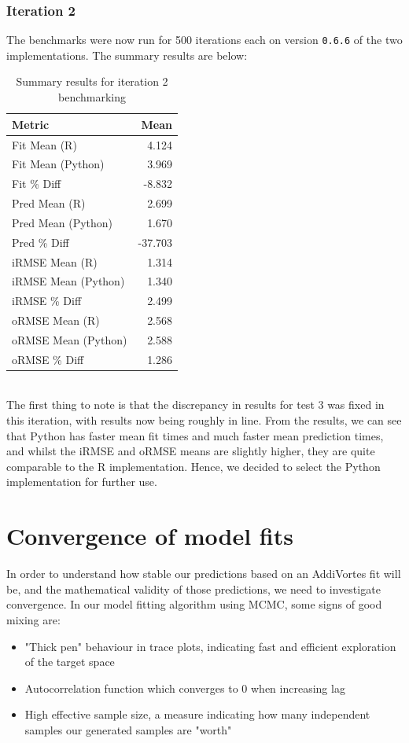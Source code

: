 \documentclass[11pt,twoside,a4paper]{article}
\begin{document}
\subsubsection{Iteration 2}
The benchmarks were now run for 500 iterations each on version \texttt{0.6.6} of the two implementations. The summary results are below:
\begin{table}[h]
\begin{center}
\begin{tabular}{|l|r|}
\hline
Metric & Mean\\
\hline\hline
Fit Mean (R) & 4.124\\
\hline
Fit Mean (Python) & 3.969\\
\hline
Fit \% Diff & -8.832\\
\hline\hline
Pred Mean (R) & 2.699\\
\hline
Pred Mean (Python) & 1.670\\
\hline
Pred \% Diff & -37.703\\
\hline\hline
iRMSE Mean (R) & 1.314\\
\hline
iRMSE Mean (Python) & 1.340\\
\hline
iRMSE \% Diff & 2.499\\
\hline\hline
oRMSE Mean (R) & 2.568\\
\hline
oRMSE Mean (Python) & 2.588\\
\hline
oRMSE \% Diff & 1.286\\
\hline
\end{tabular}
\caption{Summary results for iteration 2 benchmarking}
\end{center}
\end{table}
\\
The first thing to note is that the discrepancy in results for test 3 was fixed in this iteration, with results now being roughly in line. From the results, we can see that Python has faster mean fit times and much faster mean prediction times, and whilst the iRMSE and oRMSE means are slightly higher, they are quite comparable to the R implementation. Hence, we decided to select the Python implementation for further use.
\section{Convergence of model fits}
In order to understand how stable our predictions based on an AddiVortes fit will be, and the mathematical validity of those predictions, we need to investigate convergence. In our model fitting algorithm using MCMC, some signs of good mixing are: \begin{itemize}
\item "Thick pen" behaviour in trace plots, indicating fast and efficient exploration of the target space
\item Autocorrelation function which converges to 0 when increasing lag
\item High effective sample size, a measure indicating how many independent samples our generated samples are "worth"
\end{itemize}
\end{document}
